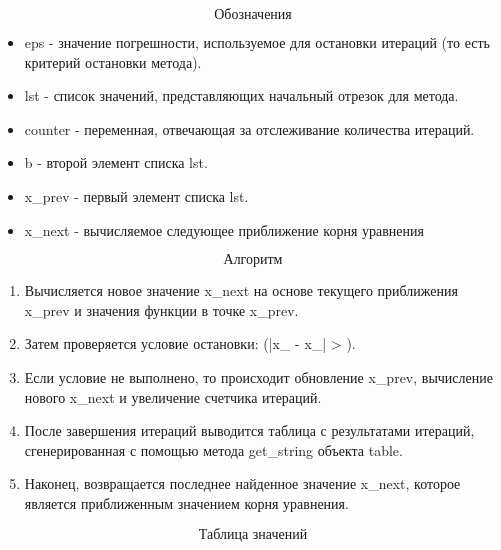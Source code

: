 \documentclass{article}
\begin{document}
$$\textbf{Обозначения}$$
\begin{itemize}
    \item eps - значение погрешности, используемое для остановки итераций (то есть критерий остановки метода).
    \item lst - список значений, представляющих начальный отрезок для метода.
    \item counter - переменная, отвечающая за отслеживание количества итераций.
    \item b - второй элемент списка lst.
   \item x\_prev - первый элемент списка lst.
   \item x\_next - вычисляемое следующее приближение корня уравнения
\end{itemize}
$$\textbf{Алгоритм}$$
\begin{enumerate}
    \item Вычисляется новое значение x\_next на основе текущего приближения x\_prev и значения функции в точке x\_prev.
    \item Затем проверяется условие остановки: (|x\_{} - x\_{}| > ).
    \item Если условие не выполнено, то происходит обновление x\_prev, вычисление нового x\_next и увеличение счетчика итераций.
    \item После завершения итераций выводится таблица с результатами итераций, сгенерированная с помощью метода get\_string объекта table.
    \item Наконец, возвращается последнее найденное значение x\_next, которое является приближенным значением корня уравнения.
\end{enumerate}

$$\textbf{Таблица значений}$$
\end{document}
